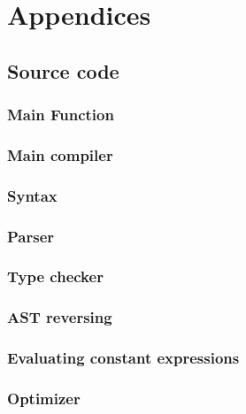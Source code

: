 \section{Appendices} \label{sec:appendices}
\subsection{Source code}
\subsubsection{Main Function}


\subsubsection{Main compiler}


\subsubsection{Syntax}


\subsubsection{Parser}


\subsubsection{Type checker}


\subsubsection{AST reversing}


\subsubsection{Evaluating constant expressions}


\subsubsection{Optimizer}


